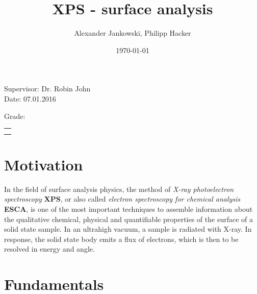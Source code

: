 \documentclass[numbers=noenddot,a4paper]{article}
\title{\fett{\underline{Report:}} XPS - surface analysis} %
\author{Alexander Jankowski, Philipp Hacker}
\date{\today}
\newcommand{\tilt}[1]{\textit{#1}}
\newcommand{\fett}[1]{\textbf{#1}}
\begin{document}
\renewcommand*{\equationautorefname}{eq.}
\renewcommand*{\figureautorefname}{fig.}
\renewcommand*{\tableautorefname}{tab.}
\renewcommand*{\sectionautorefname}{sec.}
\renewcommand*{\subsectionautorefname}{sec.}
\renewcommand*{\subsubsectionautorefname}{sec.}
\renewcommand*{\figurename}{Fig. }
\renewcommand*{\tablename}{Tab.}

\renewcommand*{\figurename}{Figure }
\renewcommand*{\tablename}{Table}

\maketitle
\begin{center}
Supervisor: Dr. Robin John\\ %
	Date: 07.01.2016 \\ %
	\begin{table}[h]
		\centering
		Grade: %
		\begin{tabularx}{1.5cm}{|X|}
			\hline \\ \\
			\hline
		\end{tabularx}
	\end{table}
\end{center}

\vspace*{\fill}
\tableofcontents
\vfill
\clearpage

	\section{Motivation}

	In the field of surface analysis physics, the method of \tilt{X-ray photoelectron spectroscopy} \fett{XPS}, or also called \tilt{electron spectroscopy for chemical analysis} \fett{ESCA}, is one of the most important techniques to assemble information about the qualitative chemical, physical and quantifiable properties of the surface of a solid state sample. In an ultrahigh vacuum, a sample is radiated with X-ray. In response,  the solid state body emits a flux of electrons, which is then to be resolved in energy and angle.\\


	\clearpage
	\section{Fundamentals}
\end{document}
